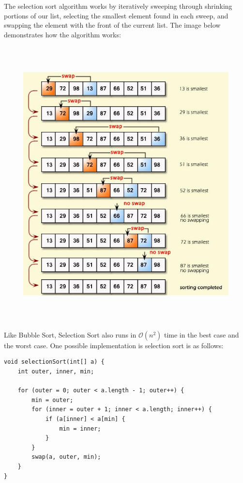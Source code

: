 The selection sort algorithm works by iteratively sweeping through shrinking portions of our list, selecting the smallest element found in each sweep, and swapping the element with the front of the current list. The image below demonstrates how the algorithm works:
 
\begin{figure}[h]
\includegraphics[width=\textwidth, height=15cm]{media/ssort.jpg}
\centering
\end{figure}

\newpage


Like Bubble Sort, Selection Sort also runs in $\mathcal{O}(n^2)$ time in the best case and the worst case. One possible implementation is selection sort is as follows:

\begin{lstlisting}
void selectionSort(int[] a) {
    int outer, inner, min;
    
    for (outer = 0; outer < a.length - 1; outer++) {
        min = outer;
        for (inner = outer + 1; inner < a.length; inner++) {
            if (a[inner] < a[min] {
                min = inner;
            }
        }
        swap(a, outer, min);
    }
}
\end{lstlisting}


